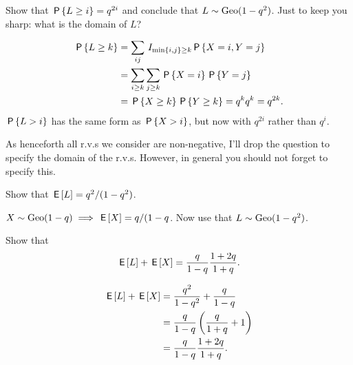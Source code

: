 \documentclass[a4paper,12pt]{article}
\begin{document}
\begin{exercise}
Show that $\P{L\geq i}=q^{2i}$ and conclude that $L\sim\Geo{1-q^{2}}$. Just to keep you sharp: what is the domain of $L$?
\begin{solution}
  \begin{align}
    \label{eq:12}
\P{L\geq k} 
&= \sum_{ij} \1{\min{i,j}\geq k} \P{X=i, Y=j}\\
&= \sum_{i\geq k} \sum_{j\geq k} \P{X=i}\P{Y=j}\\
&=  \P{X\geq k}\P{Y\geq k} = q^{k} q^{k} = q^{2k}.
  \end{align}
$\P{L>i}$ has the same form as $\P{X>i}$, but now with $q^{2i}$ rather than $q^{i}$.
\end{solution}
\end{exercise}

As henceforth all r.v.s we consider are non-negative, I'll drop the question to specify the domain of the r.v.s. However, in general you should not forget to specify this. 



\begin{exercise}\label{ex:3}
Show that  $\E L=q^{2}/(1-q^{2})$.
\begin{solution}
$X\sim \Geo{1-q} \implies \E X = q/(1-q$. Now use that $L\sim\Geo{1-q^{2}}$. 
\end{solution}
\end{exercise}

\begin{exercise}
Show that 
\begin{equation}
  \label{eq:39}
\E L + \E X = \frac q{1-q}\frac{1+2q}{1+q}.
\end{equation}
\begin{solution}
  \begin{align}
    \label{eq:2}
\E L     + \E X 
&= \frac{q^{2}}{1-q^2} + \frac{q}{1-q} \\
&= \frac q{1-q}\left(\frac{q}{1+q} + 1\right)\\
&= \frac q{1-q}\frac{1+2q}{1+q}.
  \end{align}
\end{solution}
\end{exercise}
\end{document}
